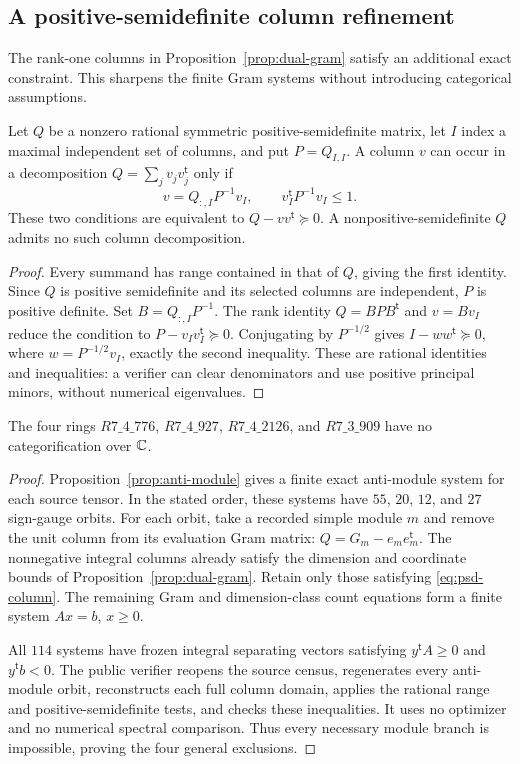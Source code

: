 \subsection{A positive-semidefinite column refinement}
\label{sec:psd-gram}
The rank-one columns in Proposition~\ref{prop:dual-gram} satisfy an
additional exact constraint. This sharpens the finite Gram systems
without introducing categorical assumptions.

\begin{proposition}
\label{prop:psd-column}
Let $Q$ be a nonzero rational symmetric positive-semidefinite matrix, let $I$
index a maximal independent set of columns, and put $P=Q_{I,I}$.
A column $v$ can occur in a decomposition $Q=\sum_jv_jv_j^{\mathsf t}$
only if
\[
 v=Q_{:,I}P^{-1}v_I,\qquad v_I^{\mathsf t}P^{-1}v_I\leq1.
 \tag{$\ddagger$}\label{eq:psd-column}
\]
These two conditions are equivalent to
$Q-vv^{\mathsf t}\succeq0$. A nonpositive-semidefinite $Q$ admits
no such column decomposition.
\end{proposition}
\begin{proof}
Every summand has range contained in that of $Q$, giving the first
identity. Since $Q$ is positive semidefinite and its selected columns
are independent, $P$ is positive definite. Set $B=Q_{:,I}P^{-1}$.
The rank identity $Q=BPB^{\mathsf t}$ and $v=Bv_I$ reduce the
condition to $P-v_Iv_I^{\mathsf t}\succeq0$. Conjugating by
$P^{-1/2}$ gives $I-ww^{\mathsf t}\succeq0$, where
$w=P^{-1/2}v_I$, exactly the second inequality. These are rational
identities and inequalities: a verifier can clear denominators and
use positive principal minors, without numerical eigenvalues.
\end{proof}

\begin{theorem}
\label{thm:psd-gram}
The four rings $R7\_4\_776$, $R7\_4\_927$, $R7\_4\_2126$, and
$R7\_3\_909$ have no categorification over $\mathbb C$.
\end{theorem}
\begin{proof}
Proposition~\ref{prop:anti-module} gives a finite exact anti-module
system for each source tensor. In the stated order, these systems have
$55$, $20$, $12$, and $27$ sign-gauge orbits. For each orbit, take a recorded simple module
$m$ and remove the unit column from its evaluation Gram matrix:
$Q=G_m-e_me_m^{\mathsf t}$. The nonnegative integral columns already
satisfy the dimension and coordinate bounds of
Proposition~\ref{prop:dual-gram}. Retain only those satisfying
\eqref{eq:psd-column}. The remaining Gram and dimension-class count
equations form a finite system $Ax=b$, $x\geq0$.

All $114$ systems have frozen integral separating vectors satisfying
$y^{\mathsf t}A\geq0$ and $y^{\mathsf t}b<0$. The public verifier
reopens the source census, regenerates every anti-module orbit,
reconstructs each full column domain, applies the rational range and
positive-semidefinite tests, and checks these inequalities. It uses
no optimizer and no numerical spectral comparison. Thus every
necessary module branch is impossible, proving the four general
exclusions.
\end{proof}
